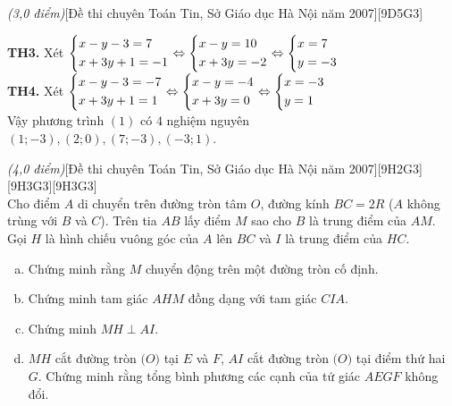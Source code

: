 \begin{ex}{\it{(3,0 điểm)}}[Đề thi chuyên Toán Tin, Sở Giáo dục Hà Nội năm 2007][9D5G3]
{\begin{enumerate}[a)]
	\textbf{TH3.} Xét $\left\{\begin{aligned}&x-y-3=7\\&x+3y+1=-1\end{aligned}\right.\Leftrightarrow \left\{\begin{aligned}&x-y=10\\&x+3y=-2\end{aligned}\right.\Leftrightarrow \left\{\begin{aligned}&x=7\\&y=-3\end{aligned}\right.$\\
	\textbf{TH4.}  Xét $\left\{\begin{aligned}&x-y-3=-7\\&x+3y+1=1\end{aligned}\right.\Leftrightarrow \left\{\begin{aligned}&x-y=-4\\&x+3y=0\end{aligned}\right. \Leftrightarrow \left\{\begin{aligned}&x=-3\\&y=1\end{aligned}\right.$\\
	Vậy phương trình $(1)$ có $4$ nghiệm nguyên $(1;-3),(2;0),(7;-3),(-3;1)$.
	\end{enumerate}	
}
\end{ex}
\begin{ex}{\it{(4,0 điểm)}}[Đề thi chuyên Toán Tin, Sở Giáo dục Hà Nội năm 2007][9H2G3][9H3G3][9H3G3]\\
Cho điểm $A$ di chuyển trên đường tròn tâm $O$, đường kính $BC = 2R$ ($A$ không trùng với $B$ và $C$). Trên tia $AB$ lấy điểm $M$ sao cho $B$ là trung điểm của $AM$. Gọi $H$ là hình chiếu vuông góc  của $A$ lên $BC$ và $I$ là trung điểm của $HC$.
\begin{enumerate}[a)]	
\item Chứng minh rằng $M$ chuyển động trên một đường tròn cố định.
\item  Chứng minh tam giác $AHM$ đồng dạng với tam giác $CIA$. 
\item Chứng minh $MH\perp AI$.
\item $MH$ cắt đường tròn $\big(O\big)$ tại $E$ và $F$, $AI$ cắt đường tròn $\big(O\big)$ tại điểm thứ hai $G$. Chứng minh rằng tổng bình phương các cạnh của tứ giác $AEGF$ không đổi.
\end{enumerate}
\end{ex}
